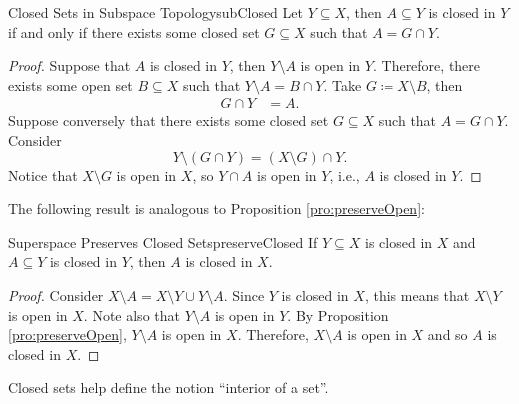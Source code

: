 \documentclass[math]{amznotes}
\makeatletter
\renewcommand{\mathring}[1]{\accentset{\circ}{#1}}
\let\save@mathaccent\mathaccent
\newcommand*\if@single[3]{%
  \setbox0\hbox{${\mathaccent"0362{#1}}^H$}%
  \setbox2\hbox{${\mathaccent"0362{\kern0pt#1}}^H$}%
  \ifdim\ht0=\ht2 #3\else #2\fi
  }
\newcommand*\rel@kern[1]{\kern#1\dimexpr\macc@kerna}
\newcommand*\widebar[1]{\@ifnextchar^{{\wide@bar{#1}{0}}}{\wide@bar{#1}{1}}}
\newcommand*\wide@bar[2]{\if@single{#1}{\wide@bar@{#1}{#2}{1}}{\wide@bar@{#1}{#2}{2}}}
\newcommand*\wide@bar@[3]{%
  \begingroup
  \def\mathaccent##1##2{%
    \let\mathaccent\save@mathaccent
    \if#32 \let\macc@nucleus\first@char \fi
    \setbox\z@\hbox{$\macc@style{\macc@nucleus}_{}$}%
    \setbox\tw@\hbox{$\macc@style{\macc@nucleus}{}_{}$}%
    \dimen@\wd\tw@
    \advance\dimen@-\wd\z@
    \divide\dimen@ 3
    \@tempdima\wd\tw@
    \advance\@tempdima-\scriptspace
    \divide\@tempdima 10
    \advance\dimen@-\@tempdima
    \ifdim\dimen@>\z@ \dimen@0pt\fi
    \rel@kern{0.6}\kern-\dimen@
    \if#31
      \overline{\rel@kern{-0.6}\kern\dimen@\macc@nucleus\rel@kern{0.4}\kern\dimen@}%
      \advance\dimen@0.4\dimexpr\macc@kerna
      \let\final@kern#2%
      \ifdim\dimen@<\z@ \let\final@kern1\fi
      \if\final@kern1 \kern-\dimen@\fi
    \else
      \overline{\rel@kern{-0.6}\kern\dimen@#1}%
    \fi
  }%
  \macc@depth\@ne
  \let\math@bgroup\@empty \let\math@egroup\macc@set@skewchar
  \mathsurround\z@ \frozen@everymath{\mathgroup\macc@group\relax}%
  \macc@set@skewchar\relax
  \let\mathaccentV\macc@nested@a
  \if#31
    \macc@nested@a\relax111{#1}%
  \else
    \def\gobble@till@marker##1\endmarker{}%
    \futurelet\first@char\gobble@till@marker#1\endmarker
    \ifcat\noexpand\first@char A\else
      \def\first@char{}%
    \fi
    \macc@nested@a\relax111{\first@char}%
  \fi
  \endgroup
}
\theoremstyle{remark}
\makeatother
\begin{document}
\begin{probox}{Closed Sets in Subspace Topology}{subClosed}
    Let $Y \subseteq X$, then $A \subseteq Y$ is closed in $Y$ if and only if there exists some closed set $G \subseteq X$ such that $A = G \cap Y$.
    \tcblower
    \begin{proof}
        Suppose that $A$ is closed in $Y$, then $Y \setminus A$ is open in $Y$. Therefore, there exists some open set $B \subseteq X$ such that $Y \setminus A = B \cap Y$. Take $G \coloneqq X \setminus B$, then 
        \begin{align*}
            G \cap Y & = A.
        \end{align*}
        Suppose conversely that there exists some closed set $G \subseteq X$ such that $A = G \cap Y$. Consider 
        \begin{equation*}
            Y \setminus \left(G \cap Y\right) = (X \setminus G) \cap Y.
        \end{equation*}
        Notice that $X \setminus G$ is open in $X$, so $Y \cap A$ is open in $Y$, i.e., $A$ is closed in $Y$.
    \end{proof}
\end{probox}
The following result is analogous to Proposition \ref{pro:preserveOpen}:
\begin{probox}{Superspace Preserves Closed Sets}{preserveClosed}
    If $Y \subseteq X$ is closed in $X$ and $A \subseteq Y$ is closed in $Y$, then $A$ is closed in $X$.
    \tcblower
    \begin{proof}
        Consider $X \setminus A = X \setminus Y \cup Y \setminus A$. Since $Y$ is closed in $X$, this means that $X \setminus Y$ is open in $X$. Note also that $Y \setminus A$ is open in $Y$. By Proposition \ref{pro:preserveOpen}, $Y \setminus A$ is open in $X$. Therefore, $X \setminus A$ is open in $X$ and so $A$ is closed in $X$.
    \end{proof}
\end{probox}
Closed sets help define the notion ``interior of a set''.
\end{document}
